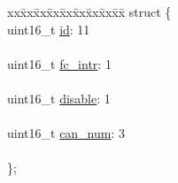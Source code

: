 \begin{DoxyCompactItemize}
\begin{tabbing}
\end{tabbing}\item 
\begin{tabbing}
xx\=xx\=xx\=xx\=xx\=xx\=xx\=xx\=xx\=\kill
struct \{\\
\>uint16\_t \hyperlink{struct____attribute_____ad3ca970dad0c3c0dde583a1916245292}{id}: 11\\
\>\\
\>uint16\_t \hyperlink{struct____attribute_____a3f327bada8b15b44b9a37ec975800f57}{fc\_intr}: 1\\
\>\\
\>uint16\_t \hyperlink{struct____attribute_____a7c608f1e67305379d24b3b770be44994}{disable}: 1\\
\>\\
\>uint16\_t \hyperlink{struct____attribute_____a3030b7aabe9418f3a7dcd682fe34fadc}{can\_num}: 3\\
\>\\
\}; \\


\end{tabbing}
\end{DoxyCompactItemize}
